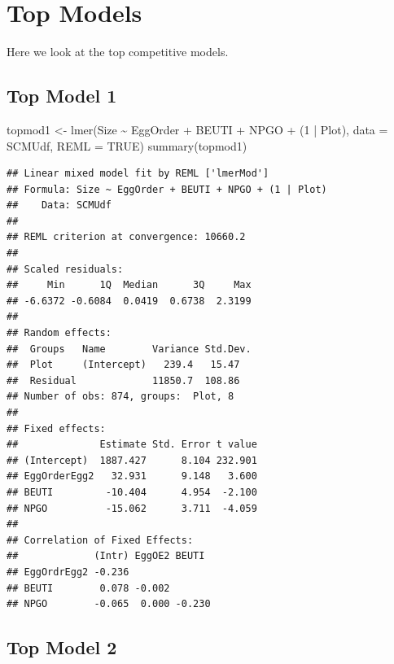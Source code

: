 \documentclass[
]{article}
\newenvironment{Shaded}{\begin{snugshade}}{\end{snugshade}}
\newcommand{\AttributeTok}[1]{\textcolor[rgb]{0.77,0.63,0.00}{#1}}
\newcommand{\ConstantTok}[1]{\textcolor[rgb]{0.00,0.00,0.00}{#1}}
\newcommand{\DecValTok}[1]{\textcolor[rgb]{0.00,0.00,0.81}{#1}}
\newcommand{\FunctionTok}[1]{\textcolor[rgb]{0.00,0.00,0.00}{#1}}
\newcommand{\NormalTok}[1]{#1}
\newcommand{\OtherTok}[1]{\textcolor[rgb]{0.56,0.35,0.01}{#1}}
\newcommand{\SpecialCharTok}[1]{\textcolor[rgb]{0.00,0.00,0.00}{#1}}
\begin{document}
\hypertarget{top-models}{%
\section{Top Models}\label{top-models}}

Here we look at the top competitive models.

\hypertarget{top-model-1}{%
\subsection{Top Model 1}\label{top-model-1}}

\begin{Shaded}
\begin{Highlighting}[]
\NormalTok{topmod1 }\OtherTok{\textless{}{-}} \FunctionTok{lmer}\NormalTok{(Size }\SpecialCharTok{\textasciitilde{}}\NormalTok{ EggOrder }\SpecialCharTok{+}\NormalTok{ BEUTI }\SpecialCharTok{+}\NormalTok{ NPGO }\SpecialCharTok{+}\NormalTok{ (}\DecValTok{1} \SpecialCharTok{|}\NormalTok{ Plot), }\AttributeTok{data =}\NormalTok{ SCMUdf, }\AttributeTok{REML =} \ConstantTok{TRUE}\NormalTok{)}
\FunctionTok{summary}\NormalTok{(topmod1)  }
\end{Highlighting}
\end{Shaded}

\begin{verbatim}
## Linear mixed model fit by REML ['lmerMod']
## Formula: Size ~ EggOrder + BEUTI + NPGO + (1 | Plot)
##    Data: SCMUdf
## 
## REML criterion at convergence: 10660.2
## 
## Scaled residuals: 
##     Min      1Q  Median      3Q     Max 
## -6.6372 -0.6084  0.0419  0.6738  2.3199 
## 
## Random effects:
##  Groups   Name        Variance Std.Dev.
##  Plot     (Intercept)   239.4   15.47  
##  Residual             11850.7  108.86  
## Number of obs: 874, groups:  Plot, 8
## 
## Fixed effects:
##              Estimate Std. Error t value
## (Intercept)  1887.427      8.104 232.901
## EggOrderEgg2   32.931      9.148   3.600
## BEUTI         -10.404      4.954  -2.100
## NPGO          -15.062      3.711  -4.059
## 
## Correlation of Fixed Effects:
##             (Intr) EggOE2 BEUTI 
## EggOrdrEgg2 -0.236              
## BEUTI        0.078 -0.002       
## NPGO        -0.065  0.000 -0.230
\end{verbatim}

\hypertarget{top-model-2}{%
\subsection{Top Model 2}\label{top-model-2}}
\end{document}

